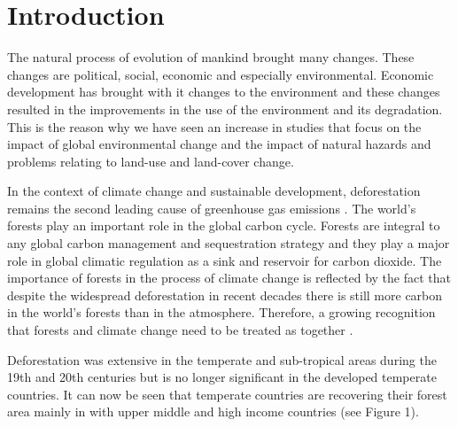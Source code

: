 
\chapter*{Introduction}  %
 



\ifpdf
    \graphicspath{{Introduction/Figs/}{Introduction/}}
\else
    \graphicspath{{Introduction/Figs/}{Introduction/}}
\fi

The natural process of evolution of mankind brought many changes. These changes are political, social, economic and especially environmental. Economic development has brought with it changes to the environment and these changes resulted in the improvements in the use of the environment and its degradation. This is the reason why we have seen an increase in studies that focus on the impact of global environmental change and the impact of natural hazards and problems relating to land-use and land-cover change. 

In the context of climate change and sustainable development, deforestation remains the second leading cause of greenhouse gas emissions \citep{culas11}. The world’s forests play an important role in the global carbon cycle. Forests are integral to any global carbon management and sequestration strategy and they play a major role in global climatic regulation as a sink and reservoir for carbon dioxide. The importance of forests in the process of climate change is reflected by the fact that despite the widespread deforestation in recent decades there is still more carbon in the world's forests than in the atmosphere. Therefore, a growing recognition that forests and climate change need to be treated as together \citep{JONG}. 

Deforestation was extensive in the temperate and sub-tropical areas during the 19th and 20th centuries but is no longer significant in the developed temperate countries. It can now be seen that temperate countries are recovering their forest area mainly in with upper middle and high income countries (see Figure 1).

